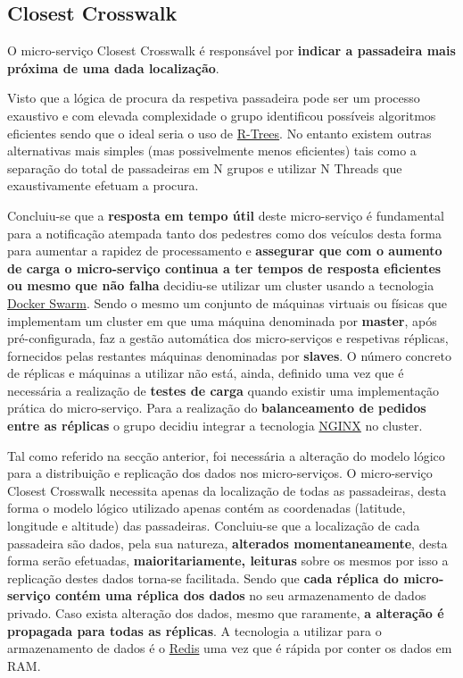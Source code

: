 \documentclass[acmsmall,nonacm,screen]{acmart}
\begin{document}
\subsection{Closest Crosswalk}
\label{closest_crosswalk} 

\hspace{5mm} O micro-serviço Closest Crosswalk é responsável por \textbf{indicar a passadeira mais próxima de uma dada localização}. 

\hspace{5mm} Visto que a lógica de procura da respetiva passadeira pode ser um processo exaustivo e com elevada complexidade o grupo identificou possíveis algoritmos eficientes sendo que o ideal seria o uso de \href{https://en.wikipedia.org/wiki/R-tree}{R-Trees}. No entanto existem outras alternativas mais simples (mas possivelmente menos eficientes) tais como a separação do total de passadeiras em N grupos e utilizar N Threads que exaustivamente efetuam a procura.

\hspace{5mm} Concluiu-se que a \textbf{resposta em tempo útil} deste micro-serviço é fundamental para a notificação atempada tanto dos pedestres como dos veículos desta forma para aumentar a rapidez de processamento e \textbf{assegurar que com o aumento de carga o micro-serviço continua a ter tempos de resposta eficientes ou mesmo que não falha} decidiu-se utilizar um cluster usando a tecnologia \href{https://docs.docker.com/engine/swarm/}{Docker Swarm}. Sendo o mesmo um conjunto de máquinas virtuais ou físicas que implementam um cluster em que uma máquina denominada por \textbf{master}, após pré-configurada, faz a gestão automática dos micro-serviços e respetivas réplicas, fornecidos pelas restantes máquinas denominadas por \textbf{slaves}. O número concreto de réplicas e máquinas a utilizar não está, ainda, definido uma vez que é necessária a realização de \textbf{testes de carga} quando existir uma implementação prática do micro-serviço. Para a realização do \textbf{balanceamento de pedidos entre as réplicas} o grupo decidiu integrar a tecnologia \href{https://www.nginx.com/}{NGINX} no cluster.

\hspace{5mm} Tal como referido na secção anterior, foi necessária a alteração do modelo lógico para a distribuição e replicação dos dados nos micro-serviços. O micro-serviço Closest Crosswalk necessita apenas da localização de todas as passadeiras, desta forma o modelo lógico utilizado apenas contém as coordenadas (latitude, longitude e altitude) das passadeiras. Concluiu-se que a localização de cada passadeira são dados, pela sua natureza, \textbf{alterados momentaneamente}, desta forma serão efetuadas, \textbf{maioritariamente, leituras} sobre os mesmos por isso a replicação destes dados torna-se facilitada. Sendo que \textbf{cada réplica do micro-serviço contém uma réplica dos dados} no seu armazenamento de dados privado. Caso exista alteração dos dados, mesmo que raramente, \textbf{a alteração é propagada para todas as réplicas}. A tecnologia a utilizar para o armazenamento de dados é o \href{https://redis.io/}{Redis} uma vez que é rápida por conter os dados em RAM.
\end{document}
